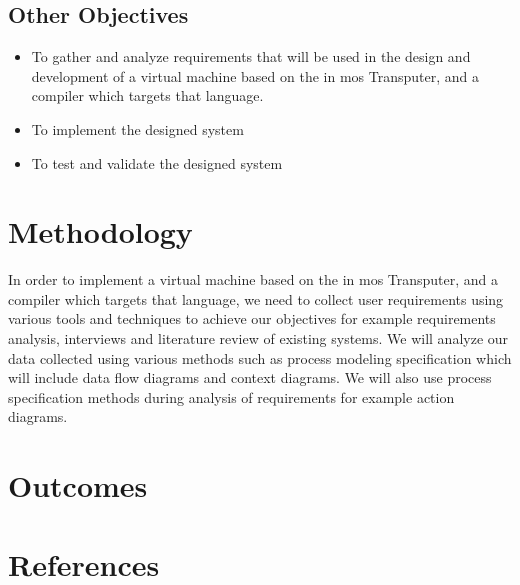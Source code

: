 \documentclass[dvips,12pt]{article}
\begin{document}
	\subsection{Other Objectives}
	
	\begin{itemize}
		\item To gather and analyze requirements that will be used in the design and development of a virtual machine based on the in mos Transputer, and a compiler which targets that language.
		\item To implement the designed system
		\item To test and validate the designed system 
	\end{itemize}
	
	\section{Methodology}
	In order to  implement a virtual machine based on the in mos Transputer, and a compiler which targets that language, we need to collect user requirements using various tools and techniques to achieve our objectives for example requirements analysis, interviews and literature review of existing systems.
	We will analyze our data collected using various methods such as process modeling specification which will include data flow diagrams and context diagrams. We will also use process specification methods during analysis of requirements for example action diagrams. 
	
	\section{Outcomes}
	
	\section{References}
	
	
\end{document}
